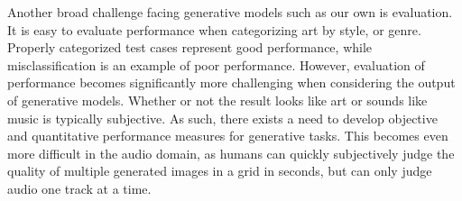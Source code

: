 \documentclass{article}
\begin{document}
Another broad challenge facing generative models such as our own is evaluation. It is easy to evaluate performance when categorizing art by style, or genre. Properly categorized test cases represent good performance, while misclassification is an example of poor performance. However, evaluation of performance becomes significantly more challenging when considering the output of generative models. Whether or not the result looks like art or sounds like music is typically subjective. As such, there exists a need to develop objective and quantitative performance measures for generative tasks. This becomes even more difficult in the audio domain, as humans can quickly subjectively judge the quality of multiple generated images in a grid in seconds, but can only judge audio one track at a time.


\end{document}
